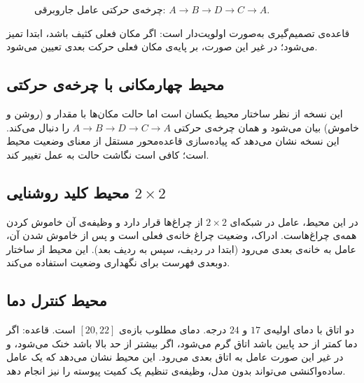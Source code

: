 \documentclass[12pt,a4paper]{article}
\newcommand{\code}[1]{\lr{\texttt{\small #1}}}
\theoremstyle{definition}
\begin{document}
\begin{figure}[h]
\centering
{}
\caption{چرخه‌ی حرکتی عامل جاروبرقی: $A \to B \to D \to C \to A$.}
\end{figure}

قاعده‌ی تصمیم‌گیری به‌صورت اولویت‌دار است: اگر مکان فعلی کثیف باشد، ابتدا تمیز می‌شود؛
در غیر این صورت، بر پایه‌ی مکان فعلی حرکت بعدی تعیین می‌شود.

\subsection{محیط چهارمکانی با چرخه‌ی حرکتی}
این نسخه از نظر ساختار محیط یکسان است اما حالت مکان‌ها با مقدار \code{'on'} و
\code{'off'} (روشن و خاموش) بیان می‌شود و همان چرخه‌ی حرکتی $A \to B \to D \to C \to A$ را
دنبال می‌کند. این نسخه نشان می‌دهد که پیاده‌سازی قاعده‌محور مستقل از معنای وضعیت محیط
است؛ کافی است نگاشت حالت به عمل تغییر کند.

\subsection{محیط کلید روشنایی $2 \times 2$}
در این محیط، عامل در شبکه‌ای $2 \times 2$ از چراغ‌ها قرار دارد و وظیفه‌ی آن خاموش کردن
همه‌ی چراغ‌هاست. ادراک، وضعیت چراغ خانه‌ی فعلی است و پس از خاموش شدن آن، عامل به خانه‌ی
بعدی می‌رود (ابتدا در ردیف، سپس به ردیف بعد). این محیط از ساختار دوبعدی فهرست برای
نگهداری وضعیت استفاده می‌کند.

\subsection{محیط کنترل دما}
دو اتاق با دمای اولیه‌ی $17$ و $24$ درجه. دمای مطلوب بازه‌ی $[20,22]$ است. قاعده: اگر دما
کمتر از حد پایین باشد اتاق گرم می‌شود، اگر بیشتر از حد بالا باشد خنک می‌شود، و در غیر
این صورت عامل به اتاق بعدی می‌رود. این محیط نشان می‌دهد که یک عامل ساده‌واکنشی می‌تواند
بدون مدل، وظیفه‌ی تنظیم یک کمیت پیوسته را نیز انجام دهد.
\end{document}
